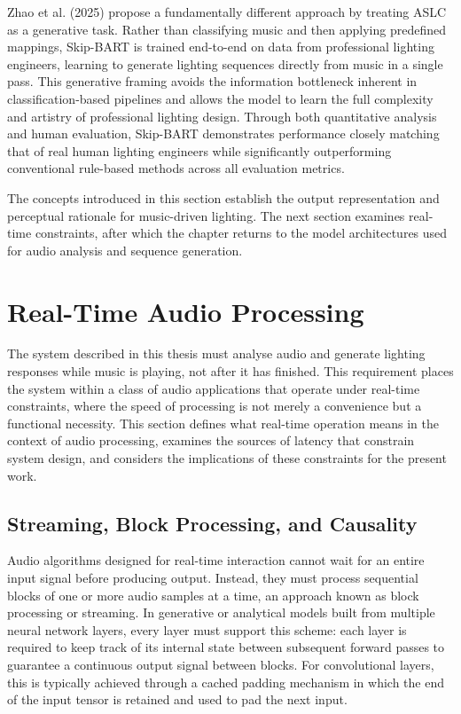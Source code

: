 Zhao et al. (2025) propose a fundamentally different approach by treating ASLC as a generative task.\cite{zhao2025automatic}  Rather than classifying music and then applying predefined mappings, Skip-BART is trained end-to-end on data from professional lighting engineers, learning to generate lighting sequences directly from music in a single pass.\cite{zhao2025automatic}  This generative framing avoids the information bottleneck inherent in classification-based pipelines and allows the model to learn the full complexity and artistry of professional lighting design. Through both quantitative analysis and human evaluation, Skip-BART demonstrates performance closely matching that of real human lighting engineers while significantly outperforming conventional rule-based methods across all evaluation metrics.\cite{zhao2025automatic} 

The concepts introduced in this section establish the output representation and perceptual rationale for music-driven lighting. The next section examines real-time constraints, after which the chapter returns to the model architectures used for audio analysis and sequence generation.

\section{Real-Time Audio Processing}

The system described in this thesis must analyse audio and generate lighting responses while music is playing, not after it has finished. This requirement places the system within a class of audio applications that operate under real-time constraints, where the speed of processing is not merely a convenience but a functional necessity. This section defines what real-time operation means in the context of audio processing, examines the sources of latency that constrain system design, and considers the implications of these constraints for the present work.

\subsection{Streaming, Block Processing, and Causality}

Audio algorithms designed for real-time interaction cannot wait for an entire input signal before producing output. Instead, they must process sequential blocks of one or more audio samples at a time, an approach known as block processing or streaming. In generative or analytical models built from multiple neural network layers, every layer must support this scheme: each layer is required to keep track of its internal state between subsequent forward passes to guarantee a continuous output signal between blocks.\cite{caspe2025designing}  For convolutional layers, this is typically achieved through a cached padding mechanism in which the end of the input tensor is retained and used to pad the next input.

